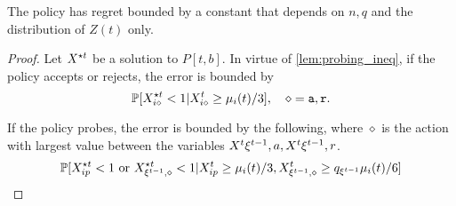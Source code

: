 \begin{theorem}
The policy has regret bounded by a constant that depends on $n,q$ and the distribution of $Z(t)$ only.
\end{theorem}
\begin{proof}
Let $X^{\star t}$ be a solution to $P[t,b]$.
In virtue of \cref{lem:probing_ineq}, if the policy accepts or rejects, the error is bounded by
\[
\mathbb{P}[X^{\star t}_{i\diamond}<1|X^t_{i\diamond}\geq \mu_i(t)/3], \quad \diamond=\texttt{a},\texttt{r}.
\]

If the policy probes, the error is bounded by the following, where $\diamond$ is the action with largest value between the variables $X^t{\xi^{t-1},a},X^t{\xi^{t-1},r}$.
\[
\mathbb{P}[X^{\star t}_{ip}<1 \text{ or } X^{\star t}_{\xi^{t-1},\diamond}<1|X^t_{ip}\geq \mu_i(t)/3, X^t_{\xi^{t-1},\diamond}\geq q_{\xi^{t-1}}\mu_i(t)/6 ]
\]

\end{proof}